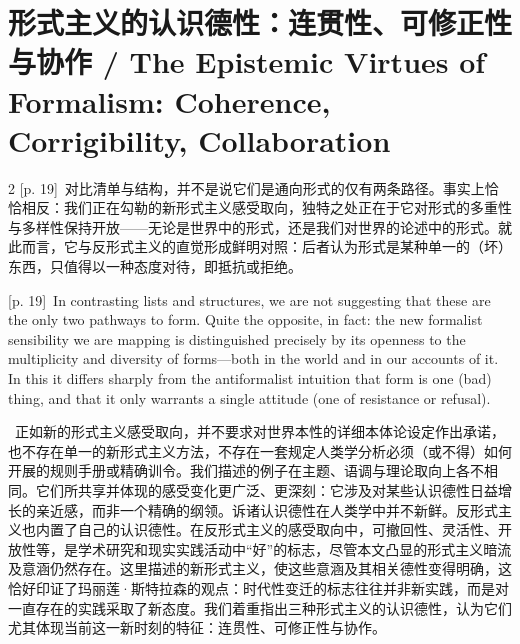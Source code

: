 \documentclass[10pt,a4paper]{article}
\begin{document}
\section*{形式主义的认识德性：连贯性、可修正性与协作 / The Epistemic Virtues of Formalism: Coherence, Corrigibility, Collaboration}
\begin{paracol}{2}
{\scriptsize\color{gray} [p. 19]}\ 对比清单与结构，并不是说它们是通向形式的仅有两条路径。事实上恰恰相反：我们正在勾勒的新形式主义感受取向，独特之处正在于它对形式的多重性与多样性保持开放——无论是世界中的形式，还是我们对世界的论述中的形式。就此而言，它与反形式主义的直觉形成鲜明对照：后者认为形式是某种单一的（坏）东西，只值得以一种态度对待，即抵抗或拒绝。\par
\switchcolumn
{\scriptsize\color{gray} [p. 19]}\ In contrasting lists and structures, we are not suggesting that these are the only two pathways to form. Quite the opposite, in fact: the new formalist sensibility we are mapping is distinguished precisely by its openness to the multiplicity and diversity of forms—both in the world and in our accounts of it. In this it differs sharply from the antiformalist intuition that form is one (bad) thing, and that it only warrants a single attitude (one of resistance or refusal).\par
\switchcolumn*
{\scriptsize\color{gray} [p. 20]}\ 正如新的形式主义感受取向，并不要求对世界本性的详细本体论设定作出承诺，也不存在单一的新形式主义方法，不存在一套规定人类学分析必须（或不得）如何开展的规则手册或精确训令。我们描述的例子在主题、语调与理论取向上各不相同。它们所共享并体现的感受变化更广泛、更深刻：它涉及对某些认识德性日益增长的亲近感，而非一个精确的纲领。诉诸认识德性在人类学中并不新鲜。反形式主义也内置了自己的认识德性。在反形式主义的感受取向中，可撤回性、灵活性、开放性等，是学术研究和现实实践活动中“好”的标志，尽管本文凸显的形式主义暗流及意涵仍然存在。这里描述的新形式主义，使这些意涵及其相关德性变得明确，这恰好印证了玛丽莲·斯特拉森的观点：时代性变迁的标志往往并非新实践，而是对一直存在的实践采取了新态度。我们着重指出三种形式主义的认识德性，认为它们尤其体现当前这一新时刻的特征：连贯性、可修正性与协作。\par
\switchcolumn

\end{paracol}
\end{document}
